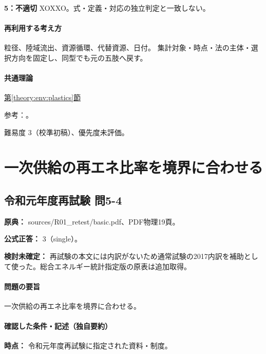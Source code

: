 \noindent\textbf{5：不適切} XOXXO。式・定義・対応の独立判定と一致しない。\par

\paragraph{再利用する考え方} 粒径、陸域流出、資源循環、代替資源、日付。 集計対象・時点・法の主体・選択方向を固定し、同型でも元の五肢へ戻す。

\paragraph{共通理論} \hyperref[theory:env:plastics]{第\ref*{theory:env:plastics}節}

\par 参考：\cite{env59_plastic}。

\par 難易度 3（校準初稿）、優先度未評価。

\section{一次供給の再エネ比率を境界に合わせる}

\subsection{令和元年度再試験 問5-4}
\label{q:r01-ret-basic-5-4}

\noindent\textbf{原典：} sources/R01\_retest/basic.pdf、PDF物理19頁。

\textbf{公式正答：} 3（single）。

\par\textbf{検討未確定：} 再試験の本文には内訳がないため通常試験の2017内訳を補助として使った。総合エネルギー統計指定版の原表は追加取得。

\paragraph{問題の要旨} 一次供給の再エネ比率を境界に合わせる。

\paragraph{確認した条件・記述（独自要約）}\mbox{}\par

\noindent\textbf{時点：} 令和元年度再試験に指定された資料・制度。\par


